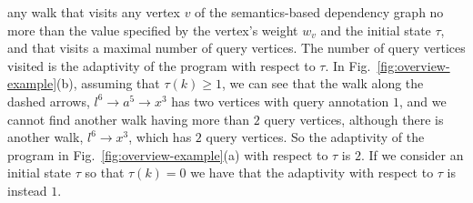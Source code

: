 any  walk  that visits any vertex $v$ of the semantics-based dependency graph no more than the value specified by the vertex's weight $w_v$ and the initial state $\tau$, and that visits a maximal number of query vertices.
The number of query vertices visited is the adaptivity of the program with respect to $\tau$.
In Fig.~\ref{fig:overview-example}(b), assuming that $\tau(k) \geq 1$, we can see that the 
walk along the dashed arrows,  $l^{6} \to a^5 \to x^3 $ has two vertices with query annotation $1$, and we cannot find another walk having more than $2$ query vertices, although there is another walk, $l^{6} \to x^3 $, which has $2$ query vertices. So the adaptivity of the program in Fig.~\ref{fig:overview-example}(a) with respect to $\tau$ is $2$. If we consider an initial state $\tau$ so that $\tau(k)=0$ we have that the adaptivity with respect to $\tau$ is instead $1$. 

